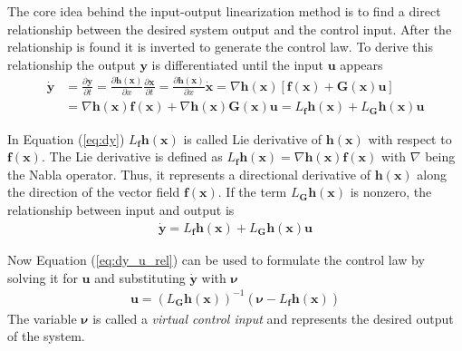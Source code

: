 \documentclass[11pt, a4paper, twoside]{report}
\begin{document}
The core idea behind the input-output linearization method is to find a direct relationship between the desired system output and the control input. After the relationship is found it is inverted to generate the control law. To derive this relationship the output $\bm{y}$ is differentiated until the input $\bm{u}$ appears
\begin{equation}
	\begin{split}
		\bm{\dot{y}} &=  \frac{\partial\bm{y}}{\partial t} = \frac{\partial\bm{h}(\bm{x})}{\partial x} \frac{\partial\bm{x}}{\partial t} = \frac{\partial\bm{h}(\bm{x})}{\partial x} \dot{\bm{x}} = \nabla\bm{h}(\bm{x}) [\bm{f}(\bm{x}) + \bm{G}(\bm{x})\bm{u}] \\
		&= \nabla\bm{h}(\bm{x}) \bm{f}(\bm{x}) + \nabla\bm{h}(\bm{x}) \bm{G}(\bm{x})\bm{u} = L_{\bm{f}} \bm{h}(\bm{x}) + L_{\bm{G}} \bm{h}(\bm{x}) \bm{u} 
		\label{eq:dy}
	\end{split}
\end{equation}

In Equation (\ref{eq:dy}) $L_{\bm{f}} \bm{h}(\bm{x})$ is called Lie derivative of $\bm{h}(\bm{x})$ with respect to $\bm{f}(\bm{x})$. The Lie derivative is defined as $L_{\bm{f}} \bm{h}(\bm{x}) = \nabla\bm{h}(\bm{x}) \bm{f}(\bm{x})$ with $\nabla$ being the Nabla operator. Thus, it represents a directional derivative of $\bm{h}(\bm{x})$ along the direction of the vector field $\bm{f}(\bm{x})$. If the term $L_{\bm{G}} \bm{h}(\bm{x})$ is nonzero, the relationship between input and output is
\begin{equation}
	\begin{split}
		\bm{\dot{y}} = L_{\bm{f}} \bm{h}(\bm{x}) + L_{\bm{G}} \bm{h}(\bm{x}) \bm{u} 
		\label{eq:dy_u_rel}
	\end{split}
\end{equation}

Now Equation (\ref{eq:dy_u_rel}) can be used to formulate the control law by solving it for $\bm{u}$ and substituting $\bm{\dot{y}}$ with $\bm{\nu}$
\begin{equation}
	\begin{split}
		\bm{u} = (L_{\bm{G}}\bm{h}(\bm{x}))^{-1} (\bm{\nu} - L_{\bm{f}}\bm{h}(\bm{x}))
		\label{eq:u_control_law}
	\end{split}
\end{equation}
The variable $\bm{\nu}$ is called a \textit{virtual control input} and represents the desired output of the system. 
\end{document}
